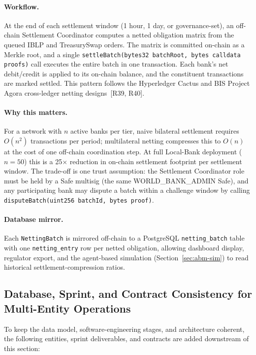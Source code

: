 \documentclass[12pt,a4paper]{report}
\begin{document}
\paragraph{Workflow.}
At the end of each settlement window (1 hour, 1 day, or governance-set), an off-chain Settlement Coordinator computes a netted obligation matrix from the queued IBLP and TreasurySwap orders. The matrix is committed on-chain as a Merkle root, and a single \texttt{settleBatch(bytes32 batchRoot, bytes calldata proofs)} call executes the entire batch in one transaction. Each bank's net debit/credit is applied to its on-chain balance, and the constituent transactions are marked settled. This pattern follows the Hyperledger Cactus and BIS Project Agora cross-ledger netting designs~[R39, R40].

\paragraph{Why this matters.}
For a network with $n$ active banks per tier, naive bilateral settlement requires $O(n^2)$ transactions per period; multilateral netting compresses this to $O(n)$ at the cost of one off-chain coordination step. At full Local-Bank deployment ($n = 50$) this is a 25$\times$ reduction in on-chain settlement footprint per settlement window. The trade-off is one trust assumption: the Settlement Coordinator role must be held by a Safe multisig (the same WORLD\_BANK\_ADMIN Safe), and any participating bank may dispute a batch within a challenge window by calling \texttt{disputeBatch(uint256 batchId, bytes proof)}.

\paragraph{Database mirror.}
Each \texttt{NettingBatch} is mirrored off-chain to a PostgreSQL \texttt{netting\_batch} table with one \texttt{netting\_entry} row per netted obligation, allowing dashboard display, regulator export, and the agent-based simulation (Section~\ref{sec:abm-sim}) to read historical settlement-compression ratios.

\subsection{Database, Sprint, and Contract Consistency for Multi-Entity Operations}
\label{sec:multi-entity-consistency}

To keep the data model, software-engineering stages, and architecture coherent, the following entities, sprint deliverables, and contracts are added downstream of this section:
\end{document}
